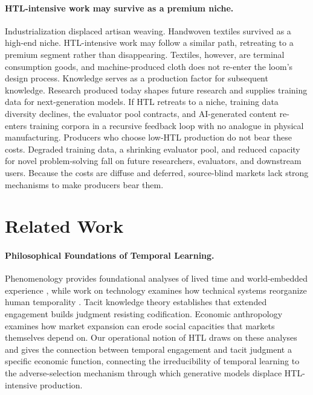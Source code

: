 \documentclass{article}
\theoremstyle{plain}
\theoremstyle{definition}
\theoremstyle{remark}
\begin{document}
\paragraph{HTL-intensive work may survive as a premium niche.}
Industrialization displaced artisan weaving. Handwoven textiles survived as a high-end niche. HTL-intensive work may follow a similar path, retreating to a premium segment rather than disappearing. Textiles, however, are terminal consumption goods, and machine-produced cloth does not re-enter the loom's design process. Knowledge serves as a production factor for subsequent knowledge. Research produced today shapes future research and supplies training data for next-generation models. If HTL retreats to a niche, training data diversity declines, the evaluator pool contracts, and AI-generated content re-enters training corpora in a recursive feedback loop with no analogue in physical manufacturing. Producers who choose low-HTL production do not bear these costs. Degraded training data, a shrinking evaluator pool, and reduced capacity for novel problem-solving fall on future researchers, evaluators, and downstream users. Because the costs are diffuse and deferred, source-blind markets lack strong mechanisms to make producers bear them.
\section{Related Work}
\label{sec:related}

\paragraph{Philosophical Foundations of Temporal Learning.}
Phenomenology provides foundational analyses of lived time and world-embedded experience \citep{Husserl1954-HUSKDW, Heidegger1927-HEISUZ}, while work on technology examines how technical systems reorganize human temporality \citep{Heidegger1954-HEIVUA, Wiener1950-WIETHU}. Tacit knowledge theory \citep{Polanyi1966-POLTTD} establishes that extended engagement builds judgment resisting codification. Economic anthropology \citep{polanyi1944greattransformation} examines how market expansion can erode social capacities that markets themselves depend on. Our operational notion of HTL draws on these analyses and gives the connection between temporal engagement and tacit judgment a specific economic function, connecting the irreducibility of temporal learning to the adverse-selection mechanism through which generative models displace HTL-intensive production.
\end{document}
